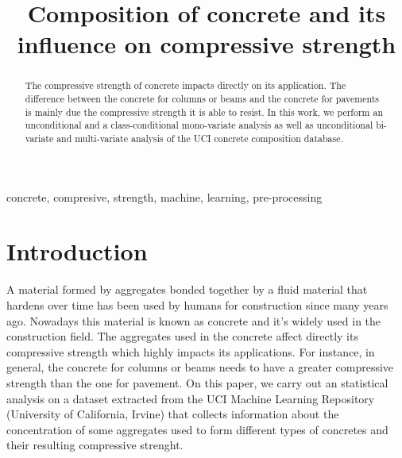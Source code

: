 \documentclass[conference]{IEEEtran}
\begin{document}
\title{Composition of concrete and its influence on compressive strength\\
}

\author{
\and
{}
}

\maketitle

\begin{abstract}
The compressive strength of concrete impacts directly on its application. The difference between the concrete for columns or beams and the concrete for pavements is mainly due the compressive strength it is able to resist. In this work, we perform an unconditional and a class-conditional mono-variate analysis as well as unconditional bi-variate and multi-variate analysis of the UCI concrete composition database.
\end{abstract}

\begin{IEEEkeywords}
concrete, compresive, strength, machine, learning, pre-processing
\end{IEEEkeywords}

\section{Introduction}
A material formed by aggregates bonded together by a fluid material that hardens over time has been used by humans for construction since many years ago\cite{b3}. Nowadays this material is known as concrete and it's widely used in the construction field. The aggregates used in the concrete affect directly its compressive strength which highly impacts its applications. For instance, in general, the concrete for columns or beams needs to have a greater compressive strength than the one for pavement. On this paper, we carry out an statistical analysis on a dataset extracted from the UCI Machine Learning Repository (University of California, Irvine) that collects information about the concentration of some aggregates used to form different types of concretes and their resulting compressive strenght. 
\end{document}
